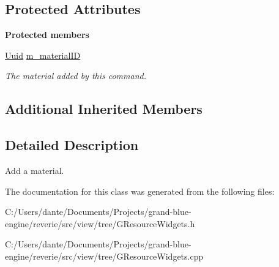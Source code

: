 \subsection*{Protected Attributes}
\begin{Indent}\textbf{ Protected members}\par
\begin{DoxyCompactItemize}
\item 
\mbox{\label{classrev_1_1_add_material_command_af5d9608f06629e93c1f5ec04e2a44186}} 
\mbox{\hyperlink{classrev_1_1_uuid}{Uuid}} \mbox{\hyperlink{classrev_1_1_add_material_command_af5d9608f06629e93c1f5ec04e2a44186}{m\+\_\+material\+ID}}
\begin{DoxyCompactList}\small\item\em The material added by this command. \end{DoxyCompactList}\end{DoxyCompactItemize}
\end{Indent}
\subsection*{Additional Inherited Members}


\subsection{Detailed Description}
Add a material. 

The documentation for this class was generated from the following files\+:\begin{DoxyCompactItemize}
\item 
C\+:/\+Users/dante/\+Documents/\+Projects/grand-\/blue-\/engine/reverie/src/view/tree/G\+Resource\+Widgets.\+h\item 
C\+:/\+Users/dante/\+Documents/\+Projects/grand-\/blue-\/engine/reverie/src/view/tree/G\+Resource\+Widgets.\+cpp\end{DoxyCompactItemize}
